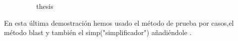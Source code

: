 \begin{isabellebody}
\ \ \ \ \ \ \isamarkupfalse%
\ \isamarkupfalse%
\ {\isacharquery}thesis\ \isacommand{{\isachardot}}\isamarkupfalse%
\isanewline
\ \ \ \ \isamarkupfalse%
\isanewline
\ \ \isamarkupfalse%
\isanewline
{}\isamarkupfalse%
%
\endisatagproof
{\isafoldproof}%
%
\isadelimproof
%
\endisadelimproof
%
\begin{isamarkuptext}%
En esta última demostración hemos usado el método de prueba por
 casos,el método blast y también el simp("simplificador") añadiéndole 
.%
\end{isamarkuptext}\isamarkuptrue%
%
\isadelimtheory
%
\endisadelimtheory
%
\isatagtheory
%
\endisatagtheory
{\isafoldtheory}%
%
\isadelimtheory
%
\endisadelimtheory
%
\end{isabellebody}%
\endinput
